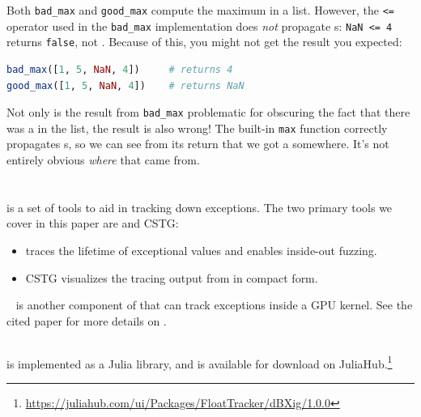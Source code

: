 \documentclass{juliacon}
\begin{document}
Both \texttt{bad\_max} and \texttt{good\_max} compute the maximum in a list.
However, the \texttt{<=} operator used in the \texttt{bad\_max} implementation does \emph{not} propagate \NaN{}s: \texttt{NaN <= 4} returns \texttt{false}, not \NaN{}.
Because of this, you might not get the result you expected:

\begin{lstlisting}[language = Julia]
bad_max([1, 5, NaN, 4])     # returns 4
good_max([1, 5, NaN, 4])    # returns NaN
\end{lstlisting}

Not only is the result from \texttt{bad\_max} problematic for obscuring the fact that there was a \NaN{} in the list, the result is also wrong!
The built-in \texttt{max} function correctly propagates \NaN{}s, so we can see from its return that we got a \NaN{} somewhere.
It's not entirely obvious \emph{where} that \NaN{} came from.

\section{\FlowFPX{}}
\label{s:flowfpx}

\FlowFPX{} is a set of tools to aid in tracking down \fp{} exceptions.
The two primary tools we cover in this paper are \FT{} and CSTG:

\begin{itemize}
\item \FT{} traces the lifetime of exceptional \fp{} values and enables inside-out fuzzing.
\item CSTG visualizes the tracing output from \FT{} in compact form.
\end{itemize}

\GPUFPX~\cite{llsflg-hpdc-2023} is another component of \FlowFPX{} that can track \fp{} exceptions inside a GPU kernel.
See the cited paper for more details on \GPUFPX.


\subsection{\FT{}}
\label{s:floattracker}

\FT{} is implemented as a Julia library, and is available for download on JuliaHub.\footnote{\url{https://juliahub.com/ui/Packages/FloatTracker/dBXig/1.0.0}}
\end{document}
